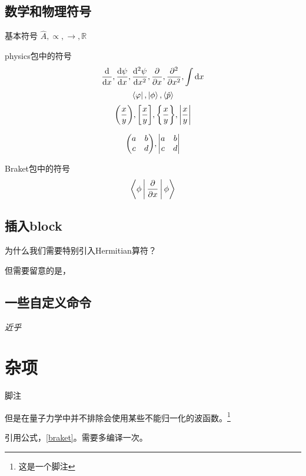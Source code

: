 \documentclass[11pt,a4paper,onecolumn]{article}
\begin{document}
\subsection{数学和物理符号}

基本符号
$ \hat A , \propto, \rightarrow, \mathbb{R}$

physics包中的符号
\begin{equation}\label{key}
 \dv{x}, \dv{\psi}{x}, \dv[2]{\psi}{x}, \pdv{x}, \pdv[2]{x} , \int \dd x
\end{equation}
\begin{equation}\label{key}
\bra{\varphi}, \ket{\phi}, \ev{\hat p}
\end{equation}  
\begin{equation}\label{key}
\qty(  \dfrac{x}{y} ), \qty[ \dfrac{x}{y} ], \qty{\dfrac{x}{y} }, \qty| \dfrac{x}{y} |
\end{equation}

\begin{equation}\label{key}
\mqty( a & b \\ c & d ), \mqty| a & b \\ c & d |
\end{equation}

Braket包中的符号
\begin{equation}\label{braket}
\Braket{\phi | \pdv{x} | \phi}
\end{equation}


\subsection{插入block}



\begin{note}
	为什么我们需要特别引入Hermitian算符？\\
	\lipsum[1]
\end{note}

\begin{warning}
	但需要留意的是，\lipsum[2]
\end{warning}
\subsection{一些自定义命令}
\emph{近乎}









\section{杂项}
脚注
\begin{note}	
	但是在量子力学中并不排除会使用某些不能归一化的波函数。\footnote{这是一个脚注}
\end{note}




引用公式，\eqref{braket}。需要多编译一次。
\end{document}
